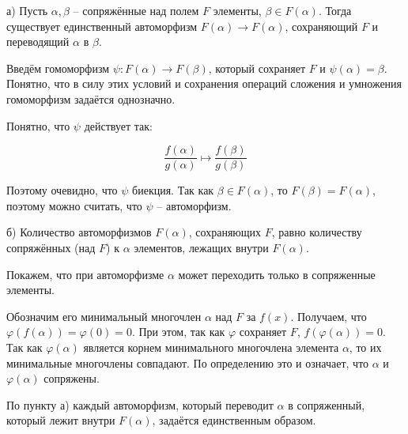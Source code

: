а) Пусть $\alpha, \beta$ -- сопряжённые над полем $F$ элементы, 
$\beta \in F(\alpha)$. Тогда существует единственный автоморфизм 
$F(\alpha) \to F(\alpha)$, сохраняющий $F$ и переводящий $\alpha$ в $\beta$.

Введём гомоморфизм $\psi: F(\alpha) \to F(\beta)$, который сохраняет $F$ и 
$\psi(\alpha) = \beta$. Понятно, что в силу этих условий и сохранения
операций сложения и умножения гомоморфизм задаётся однозначно.

Понятно, что $\psi$ действует так: 

$$
\frac{f(\alpha)}{g(\alpha)} \mapsto \frac{f(\beta)}{g(\beta)}
$$

Поэтому очевидно, что $\psi$ биекция.
Так как $\beta \in F(\alpha)$, то $F(\beta) = F(\alpha)$, поэтому можно
считать, что $\psi$ -- автоморфизм.

б) Количество автоморфизмов $F(\alpha)$, сохраняющих $F$, равно количеству сопряжённых (над $F$) к $\alpha$ элементов, лежащих внутри $F(\alpha)$.

Покажем, что при автоморфизме $\alpha$ может переходить только в сопряженные
элементы.

Обозначим его минимальный многочлен $\alpha$ над $F$ за $f(x)$. 
Получаем, что $\varphi(f(\alpha)) = \varphi(0) = 0$. При этом,
так как $\varphi$ сохраняет $F$, $f(\varphi(\alpha)) = 0$.
Так как $\varphi(\alpha)$ является корнем минимального многочлена элемента
$\alpha$, то их минимальные многочлены совпадают. По определению это и
означает, что $\alpha$ и $\varphi(\alpha)$ сопряжены.

По пункту а) каждый автоморфизм, который переводит $\alpha$ в сопряженный,
который лежит внутри $F(\alpha)$, задаётся единственным образом.
